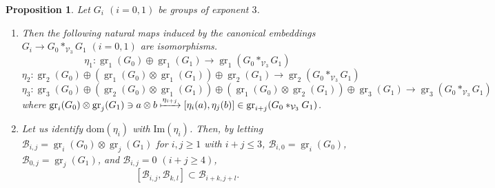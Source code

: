 \documentclass[11pt,reqno]{article}
\newtheorem{proposition}[theorem]{Proposition}
\theoremstyle{definition}
\theoremstyle{remark}
\DeclareMathOperator{\gr}{gr}
\begin{document}
\begin{proposition}\label{proposition:gr of free product}
    Let $G_i$ $(i=0,1)$ be groups of exponent $3$.
    \begin{enumerate}
        \item Then the following natural maps induced by the canonical embeddings $G_i\to G_0*_{\mathcal V_3}G_1$ $(i=0,1)$ are isomorphisms.
        \[
        \eta_1:\gr_1(G_0)\oplus \gr_1(G_1) \to \gr_1(G_0*_{\mathcal V_3}G_1)
        \]
        \[
        \eta_2:\gr_2(G_0)\oplus (\gr_1(G_0)\otimes\gr_1(G_1))\oplus \gr_2(G_1) \to \gr_2(G_0*_{\mathcal V_3}G_1)
        \]
        \[
        \eta_3:\gr_3(G_0)\oplus (\gr_2(G_0)\otimes\gr_1(G_1))\oplus (\gr_1(G_0)\otimes\gr_2(G_1)) \oplus \gr_3(G_1) \to \gr_3(G_0*_{\mathcal V_3}G_1)    
        \]
        where $\gr_i(G_0)\otimes \gr_j(G_1)\ni a\otimes b \xmapsto{\eta_{i+j}} [\eta_i(a),\eta_j(b)]\in \gr_{i+j}(G_0*_{\mathcal V_3}G_1)$. 

        \item Let us identify $\mathrm{dom}(\eta_i)$ with $\mathrm{Im}(\eta_i)$. Then, by letting $\mathcal B_{i,j}=\gr_i(G_0)\otimes \gr_j(G_1)$ for $i,j\geq 1$ with $i+j\leq 3$, $\mathcal B_{i,0}=\gr_i(G_0)$,  $\mathcal B_{0,j}=\gr_j(G_1)$, and
        $\mathcal B_{i,j}=0$ $(i+j\geq 4)$,
        \[
            [\mathcal B_{i,j},\mathcal B_{k,l}]\subset \mathcal B_{i+k,j+l}.
            \]
    \end{enumerate}    
\end{proposition}
\end{document}
